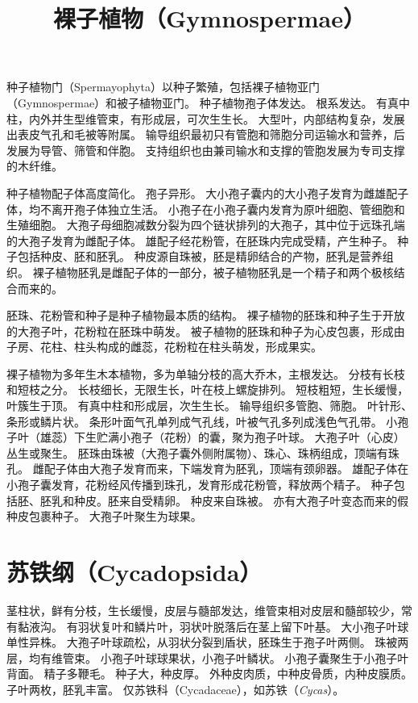 \documentclass[11pt]{article}
\title{裸子植物（Gymnospermae）}
\author{}
\date{}
\begin{document}
\begin{sloppypar}
  \maketitle

  \linenumbers
种子植物门（Spermayophyta）以种子繁殖，包括裸子植物亚门（Gymnospermae）和被子植物亚门。
种子植物孢子体发达。
根系发达。
有真中柱，内外并生型维管束，有形成层，可次生生长。
大型叶，内部结构复杂，发展出表皮气孔和毛被等附属。
输导组织最初只有管胞和筛胞分司运输水和营养，后发展为导管、筛管和伴胞。
支持组织也由兼司输水和支撑的管胞发展为专司支撑的木纤维。

\par

种子植物配子体高度简化。
孢子异形。
大小孢子囊内的大小孢子发育为雌雄配子体，均不离开孢子体独立生活。
小孢子在小孢子囊内发育为原叶细胞、管细胞和生殖细胞。
大孢子母细胞减数分裂为四个链状排列的大孢子，其中位于远珠孔端的大孢子发育为雌配子体。
雄配子经花粉管，在胚珠内完成受精，产生种子。
种子包括种皮、胚和胚乳。
种皮源自珠被，胚是精卵结合的产物，胚乳是营养组织。
裸子植物胚乳是雌配子体的一部分，被子植物胚乳是一个精子和两个极核结合而来的。

\par

胚珠、花粉管和种子是种子植物最本质的结构。
裸子植物的胚珠和种子生于开放的大孢子叶，花粉粒在胚珠中萌发。
被子植物的胚珠和种子为心皮包裹，形成由子房、花柱、柱头构成的雌蕊，花粉粒在柱头萌发，形成果实。

\par

裸子植物为多年生木本植物，多为单轴分枝的高大乔木，主根发达。
分枝有长枝和短枝之分。
长枝细长，无限生长，叶在枝上螺旋排列。
短枝粗短，生长缓慢，叶簇生于顶。
有真中柱和形成层，次生生长。
输导组织多管胞、筛胞。
叶针形、条形或鳞片状。
条形叶面气孔单列成气孔线，叶被气孔多列成浅色气孔带。
小孢子叶（雄蕊）下生贮满小孢子（花粉）的囊，聚为孢子叶球。
大孢子叶（心皮）丛生或聚生。
胚珠由珠被（大孢子囊外侧附属物）、珠心、珠柄组成，顶端有珠孔。
雌配子体由大孢子发育而来，下端发育为胚乳，顶端有颈卵器。
雄配子体在小孢子囊发育，花粉经风传播到珠孔，发育形成花粉管，释放两个精子。
种子包括胚、胚乳和种皮。胚来自受精卵。
种皮来自珠被。
亦有大孢子叶变态而来的假种皮包裹种子。
大孢子叶聚生为球果。

\section{苏铁纲（Cycadopsida）}
茎柱状，鲜有分枝，生长缓慢，皮层与髓部发达，维管束相对皮层和髓部较少，常有黏液沟。
有羽状复叶和鳞片叶，羽状叶脱落后在茎上留下叶基。
大小孢子叶球单性异株。
大孢子叶球疏松，从羽状分裂到盾状，胚珠生于孢子叶两侧。
珠被两层，均有维管束。
小孢子叶球球果状，小孢子叶鳞状。
小孢子囊聚生于小孢子叶背面。
精子多鞭毛。
种子大，种皮厚。
外种皮肉质，中种皮骨质，内种皮膜质。
子叶两枚，胚乳丰富。
仅苏铁科（Cycadaceae），如苏铁（\textit{Cycas}）。


\end{sloppypar}
\end{document}
